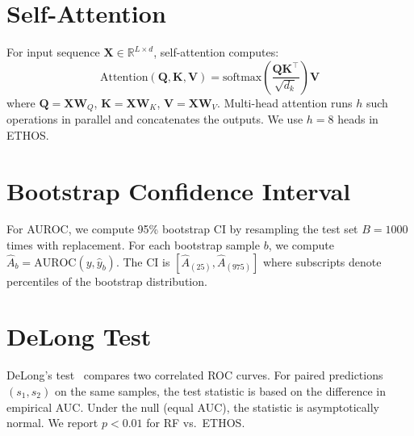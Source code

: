 \section{Self-Attention}

For input sequence $\mathbf{X} \in \mathbb{R}^{L \times d}$, self-attention computes:
\begin{equation}
\text{Attention}(\mathbf{Q}, \mathbf{K}, \mathbf{V}) = \text{softmax}\left(\frac{\mathbf{Q}\mathbf{K}^\top}{\sqrt{d_k}}\right) \mathbf{V}
\end{equation}
where $\mathbf{Q} = \mathbf{X}\mathbf{W}_Q$, $\mathbf{K} = \mathbf{X}\mathbf{W}_K$, $\mathbf{V} = \mathbf{X}\mathbf{W}_V$. Multi-head attention runs $h$ such operations in parallel and concatenates the outputs. We use $h=8$ heads in ETHOS.

\section{Bootstrap Confidence Interval}

For AUROC, we compute 95\% bootstrap CI by resampling the test set $B=1000$ times with replacement. For each bootstrap sample $b$, we compute $\hat{A}_b = \text{AUROC}(y, \hat{y}_b)$. The CI is $[\hat{A}_{(25)}, \hat{A}_{(975)}]$ where subscripts denote percentiles of the bootstrap distribution.

\section{DeLong Test}

DeLong's test~\cite{delong1988comparing} compares two correlated ROC curves. For paired predictions $(s_1, s_2)$ on the same samples, the test statistic is based on the difference in empirical AUC. Under the null (equal AUC), the statistic is asymptotically normal. We report $p < 0.01$ for RF vs.\ ETHOS.
